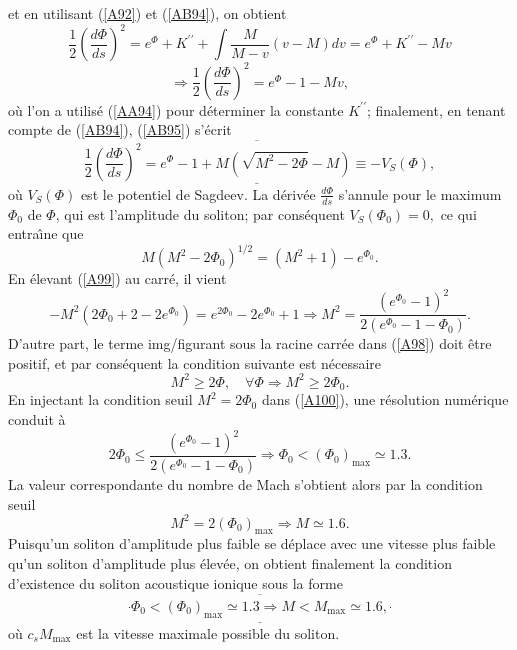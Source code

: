 \documentclass[10pt,thmsa]{article}
\begin{document}
et en utilisant (\ref{A92}) et (\ref{AB94}), on obtient
\begin{equation}
\frac{1}{2}\left(  \frac{d\Phi}{ds}\right)  ^{2}=e^{\Phi}+K^{\prime\prime
}+\int\frac{M}{M-v}(v-M)dv=e^{\Phi}+K^{\prime\prime}-Mv\label{AA95}%
\end{equation}%
\begin{equation}
\Rightarrow\frac{1}{2}\left(  \frac{d\Phi}{ds}\right)  ^{2}=e^{\Phi
}-1-Mv,\label{AB95}%
\end{equation}
o\`{u} l'on a utilis\'{e} (\ref{AA94}) pour d\'{e}terminer la constante
$K^{\prime\prime}$; finalement, en tenant compte de (\ref{AB94}), (\ref{AB95})
s'\'{e}crit
\begin{equation}
\overline{\underline{\frac{1}{2}\left(  \frac{d\Phi}{ds}\right)  ^{2}=e^{\Phi
}-1+M(\sqrt{M^{2}-2\Phi}-M)\equiv-V_{S}(\Phi)}},\label{A98}%
\end{equation}
o\`{u} $V_{S}(\Phi)$ est le potentiel de Sagdeev. La d\'{e}riv\'{e}e
$\frac{d\Phi}{ds}$ s'annule pour le maximum $\Phi_{0}$ de $\Phi$, qui est
l'amplitude du soliton; par cons\'{e}quent $V_{S}(\Phi_{0})=0,$ ce qui
entra\^{\i}ne que
\begin{equation}
M(M^{2}-2\Phi_{0})^{1/2}=(M^{2}+1)-e^{\Phi_{0}}.\label{A99}%
\end{equation}
En \'{e}levant (\ref{A99}) au carr\'{e}, il vient
\begin{equation}
-M^{2}(2\Phi_{0}+2-2e^{\Phi_{0}})=e^{2\Phi_{0}}-2e^{\Phi_{0}}+1\Rightarrow
M^{2}=\frac{(e^{\Phi_{0}}-1)^{2}}{2(e^{\Phi_{0}}-1-\Phi_{0})}.\label{A100}%
\end{equation}
D'autre part, le terme img/figurant sous la racine carr\'{e}e dans (\ref{A98})
doit \^{e}tre positif, et par cons\'{e}quent la condition suivante est
n\'{e}cessaire
\begin{equation}
M^{2}\geq2\Phi,\quad\forall\Phi\Rightarrow M^{2}\geq2\Phi_{0}.\label{A101}%
\end{equation}
En injectant la condition seuil $M^{2}=2\Phi_{0}$ dans (\ref{A100}), une
r\'{e}solution num\'{e}rique conduit \`{a}
\begin{equation}
2\Phi_{0}\leq\frac{(e^{\Phi_{0}}-1)^{2}}{2(e^{\Phi_{0}}-1-\Phi_{0}%
)}\Rightarrow\Phi_{0}<(\Phi_{0})_{\max}\simeq1.3.\label{AA101}%
\end{equation}
La valeur correspondante du nombre de Mach s'obtient alors par la condition
seuil
\begin{equation}
M^{2}=2(\Phi_{0})_{\max}\Rightarrow M\simeq1.6.\label{A102}%
\end{equation}
Puisqu'un soliton d'amplitude plus faible se d\'{e}place avec une vitesse plus
faible qu'un soliton d'amplitude plus \'{e}lev\'{e}e, on obtient finalement la
condition d'existence du soliton acoustique ionique sous la forme
\begin{equation}
\underline{\overline{\frac{^{{}}}{{}}\Phi_{0}<(\Phi_{0})_{\max}\simeq
1.3\Rightarrow M<M_{\max}\simeq1.6,\frac{^{{}}}{{}}}}\label{AB102}%
\end{equation}
o\`{u} $c_{s}M_{\max}$ est la vitesse maximale possible du soliton$.$
\end{document}
